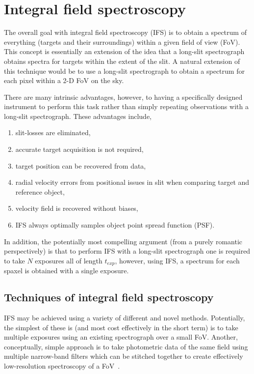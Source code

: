 
\section{Integral field spectroscopy} %
\label{sec:IFS}

The overall goal with integral field spectroscopy (IFS) is to obtain a spectrum of everything (targets and their surroundings) within a given field of view (FoV).
This concept is essentially an extension of the idea that a long-slit spectrograph obtains spectra for targets within the extent of the slit.
A natural extension of this technique would be to use a long-slit spectrograph to obtain a spectrum for each pixel within a 2-D FoV on the sky.

There are many intrinsic advantages, however, to having a specifically designed instrument to perform this task rather than simply repeating observations with a long-slit spectrograph.
These advantages include,

\begin{enumerate}
    \item slit-losses are eliminated,
    \item accurate target acquisition is not required,
    \item target position can be recovered from data,
    \item radial velocity errors from positional issues in slit when comparing target and reference object,
    \item velocity field is recovered without biases,
    \item IFS always optimally samples object point spread function (PSF).
\end{enumerate}

In addition, the potentially most compelling argument (from a purely romantic perspectively) is that to perform IFS with a long-slit spectrograph one is required to take $N$ exposures all of length $t_{exp}$, however, using IFS, a spectrum for each spaxel is obtained with a single exposure.


\subsection{Techniques of integral field spectroscopy} %
\label{sub:techniques_of_integral_field_spectroscopy}

IFS may be achieved using a variety of different and novel methods.
Potentially, the simplest of these is (and most cost effectively in the short term) is to take multiple exposures using an existing spectrograph over a small FoV.
Another, conceptually, simple approach is to take photometric data of the same field using multiple narrow-band filters which can be stitched together to create effectively low-resolution spectroscopy of a FoV~\citep[e.g. GTC-OSIRIS]{2011PASP..123.1107M}.


